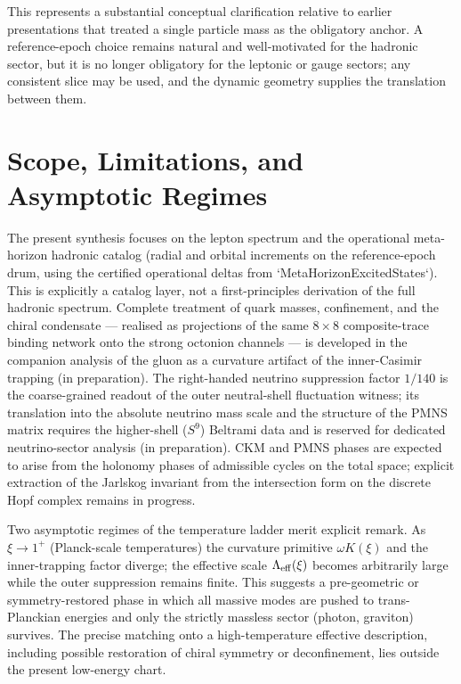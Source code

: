 \documentclass[11pt]{amsart}
\begin{document}
This represents a substantial conceptual clarification relative to earlier presentations that treated a single particle mass as the obligatory anchor. A reference-epoch choice remains natural and well-motivated for the hadronic sector, but it is no longer obligatory for the leptonic or gauge sectors; any consistent slice may be used, and the dynamic geometry supplies the translation between them.

\section{Scope, Limitations, and Asymptotic Regimes}

The present synthesis focuses on the lepton spectrum and the operational meta-horizon hadronic catalog (radial and orbital increments on the reference-epoch drum, using the certified operational deltas from `MetaHorizonExcitedStates`). This is explicitly a catalog layer, not a first-principles derivation of the full hadronic spectrum. Complete treatment of quark masses, confinement, and the chiral condensate — realised as projections of the same \(8\times 8\) composite-trace binding network onto the strong octonion channels — is developed in the companion analysis of the gluon as a curvature artifact of the inner-Casimir trapping (in preparation). The right-handed neutrino suppression factor \(1/140\) is the coarse-grained readout of the outer neutral-shell fluctuation witness; its translation into the absolute neutrino mass scale and the structure of the PMNS matrix requires the higher-shell (\(S^9\)) Beltrami data and is reserved for dedicated neutrino-sector analysis (in preparation). CKM and PMNS phases are expected to arise from the holonomy phases of admissible cycles on the total space; explicit extraction of the Jarlskog invariant from the intersection form on the discrete Hopf complex remains in progress.

Two asymptotic regimes of the temperature ladder merit explicit remark. As \(\xi\to 1^+\) (Planck-scale temperatures) the curvature primitive \(\omega K(\xi)\) and the inner-trapping factor diverge; the effective scale \(\Lambda_{\rm eff}(\xi)\) becomes arbitrarily large while the outer suppression remains finite. This suggests a pre-geometric or symmetry-restored phase in which all massive modes are pushed to trans-Planckian energies and only the strictly massless sector (photon, graviton) survives. The precise matching onto a high-temperature effective description, including possible restoration of chiral symmetry or deconfinement, lies outside the present low-energy chart.
\end{document}
